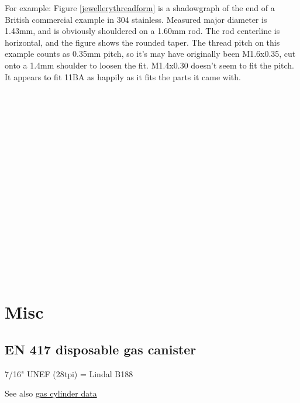 For example: Figure \ref{jewellerythreadform} is a shadowgraph of the end of a British commercial example in 304 stainless.  Measured major diameter is 1.43mm, and is obviously shouldered on a 1.60mm rod. The rod centerline is horizontal, and the figure shows the rounded taper.  The thread pitch on this example counts as 0.35mm pitch, so it's may have originally been M1.6x0.35, cut onto a 1.4mm shoulder to loosen the fit.  M1.4x0.30 doesn't seem to fit the pitch.  It appears to fit 11BA as happily as it fits the parts it came with.
\\ \\ \\ \\ \\ \\ \\ \\ \\ \\ \\ \\ \\ \\ \\ \\ \\ \\               



\clearpage
\section{Misc}
\subsection{EN 417 disposable gas canister}\label{gas_cylinder_threads}
7/16" UNEF (28tpi) = Lindal B188 

See also \hyperref[gas_cylinders]{gas cylinder data}

\clearpage
                                                                                                                   
\clearpage
